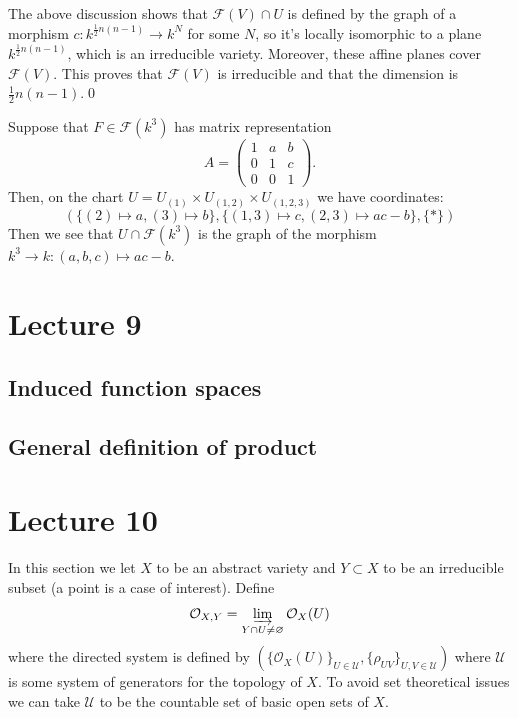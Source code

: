 The above discussion shows that $\mathcal{F}(V)\cap U$ is defined by the graph of a morphism  
$c: k^{\frac12 n(n-1)}\to k^N$ for some $N$, so it's locally isomorphic to a plane 
$k^{\frac12 n(n-1)}$, which is an irreducible variety. Moreover, these affine planes cover 
$\mathcal{F}(V)$. This proves that $\mathcal{F}(V)$ is irreducible and 
that the dimension is $\frac12 n(n-1)$.\qed

\begin{example}
Suppose that $F\in\mathcal{F}(k^3)$ has matrix representation 
\begin{equation}
    A = \begin{pmatrix}
        1&a&b\\ 0&1&c \\ 0&0&1
    \end{pmatrix}.
\end{equation}
Then, on the chart $U=U_{(1)}\times U_{(1,2)}\times U_{(1,2,3)}$ we have coordinates: 
\begin{equation}
    (\{(2)\mapsto a, (3)\mapsto b\}, \{(1,3)\mapsto c, (2,3)\mapsto ac - b\}, \{*\})
\end{equation} 
Then we see that $U\cap\mathcal{F}(k^3)$ is the graph of the morphism $k^3\to k: (a,b,c)\mapsto ac -b$.
\end{example}

\section{Lecture 9}
\subsection{Induced function spaces}
\subsection{General definition of product}

\section{Lecture 10}
In this section we let $X$ to be an abstract variety and $Y\subset X$ to be an irreducible subset 
(a point is a case of interest). Define 
\begin{equation}
    \mathcal{O}_{X,Y} = \varinjlim_{Y\cap U\neq\varnothing}\mathcal{O}_X(U)
\end{equation}
where the directed system is defined by $(\{\mathcal{O}_X(U)\}_{U\in \mathcal{U}}, \{\rho_{UV}\}_{U,V\in\mathcal{U}})$
where $\mathcal{U}$ is some system of generators for the topology of $X$. To avoid set theoretical issues we can 
take $\mathcal{U}$ to be the countable set of basic open sets of $X$. 

